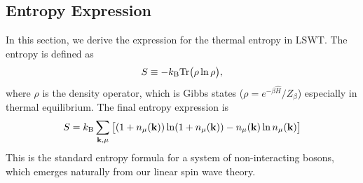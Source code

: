 \documentclass[aps, prx, nofootinbib, superscriptaddress]{revtex4-2}
\newcommand{\kvec}{\mathbf{k}}
\newcommand{\Tr}{\mathrm{Tr}}
\begin{document}
\subsection{Entropy Expression}\label{subsec: Entropy}
In this section, we derive the expression for the thermal entropy in LSWT. 
The entropy is defined as 
\begin{equation}
    S \equiv -k_{\rm B}\Tr \big( \rho \ln \rho \big),
\end{equation}
where $\rho$ is the density operator, which is Gibbs states ($\rho = e^{-\beta \hat{H}}/Z_{\beta}$) especially in thermal equilibrium.
The final entropy expression is
\begin{equation}
    S = k_{\rm B} \sum_{\kvec, \mu} \big[ (1 + n_{\mu}(\kvec)) \ln (1 + n_{\mu}(\kvec)) - n_{\mu}(\kvec) \ln n_{\mu} (\kvec) \big]
\end{equation}
This is the standard entropy formula for a system of non-interacting bosons, which emerges naturally from our linear spin wave theory.
\end{document}
